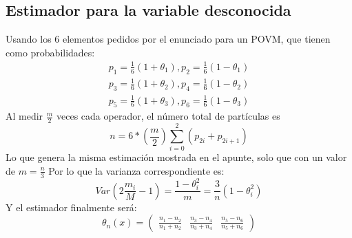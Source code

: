 \documentclass{book}
\begin{document}
\subsection{Estimador para la variable desconocida}
Usando los 6 elementos pedidos por el enunciado para un POVM, que tienen como probabilidades:
\begin{equation}\label{eq2.171}\begin{aligned}p_1=\frac{1}{6}(1+\theta_1), p_2=\frac{1}{6}(1-\theta_1)\\ p_3=\frac{1}{6}(1+\theta_2), p_4=\frac{1}{6}(1-\theta_2)\\ p_5=\frac{1}{6}(1+\theta_3), p_6=\frac{1}{6}(1-\theta_3)\end{aligned}\end{equation}
Al medir $\frac{m}{2}$ veces cada operador, el número total de partículas es
\begin{equation}\label{eq2.172}n= 6*(\frac{m}{2})\sum_{i=0}^2 (p_{2i}+p_{2i+1})\end{equation}
Lo que genera la misma estimación mostrada en el apunte, solo que con un valor de $m=\frac{n}{3}$
Por lo que la varianza correspondiente es:
\begin{equation}\label{eq2.173}Var(2\frac{m_i}{M}-1)=\frac{1-\theta_i^2}{m}=\frac{3}{n}(1-\theta_i^2)\end{equation}
Y el estimador finalmente será:
\begin{equation}\label{eq2.174}\theta_n(x)=\begin{pmatrix} \frac{n_1-n_2}{n_1+n_2} & \frac{n_3-n_4}{n_3+n_4} & \frac{n_5-n_6}{n_5+n_6}\end{pmatrix}\end{equation}
\end{document}
